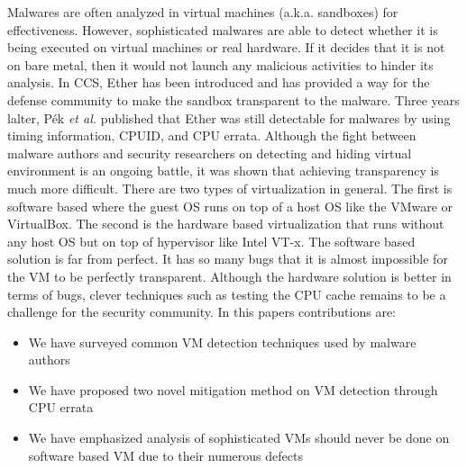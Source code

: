 Malwares are often analyzed in virtual machines (a.k.a. sandboxes) for effectiveness. However, sophisticated malwares are able to detect whether it is being executed on virtual machines or real hardware. If it decides that it is not on bare metal, then it would not launch any malicious activities to hinder its analysis. In CCS, Ether \cite{ether} has been introduced and has provided a way for the defense community to make the sandbox transparent to the malware. Three years lalter, P{\'e}k \textit{et al.}\cite{nether} published that Ether\cite{ether} was still detectable for malwares by using timing information, CPUID, and CPU errata. Although the fight between malware authors and security researchers on detecting and hiding virtual environment is an ongoing battle, it was shown that achieving transparency is much more difficult.
There are two types of virtualization in general. The first is software based where the guest OS runs on top of a host OS like the VMware or VirtualBox. The second is the hardware based virtualization that runs without any host OS but on top of hypervisor like Intel VT-x. The software based solution is far from perfect. It has so many bugs that it is almost impossible for the VM to be perfectly transparent. Although the hardware solution is better in terms of bugs, clever techniques such as testing the CPU cache remains to be a challenge for the security community.
In this paper\textquotesingle s contributions are:

\begin{itemize}
\item We have surveyed common VM detection techniques used by malware authors
\item We have proposed two novel mitigation method on VM detection through CPU errata
\item We have emphasized analysis of sophisticated VMs should never be done on software based VM due to their numerous defects 
\end{itemize}

